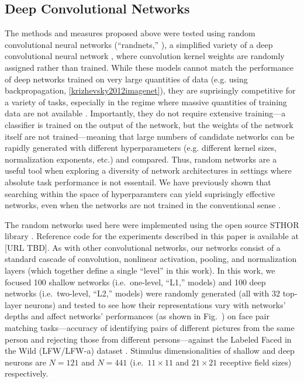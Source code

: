 \subsection{Deep Convolutional Networks}

The methods and measures proposed above were tested using random convolutional neural networks (``randnets,'' \cite{pinto2009high, sthor}), a simplified variety of a deep convolutional neural network \cite{fukushima1980neocognitron, lecun1998gradient, riesenhuber1999hierarchical, krizhevsky2012imagenet}, where convolution kernel weights are randomly assigned rather than trained.  While these models cannot match the performance of deep networks trained on very large quantities of data (e.g. using backpropagation, \ref{krizhevsky2012imagenet}), they are suprisingly competitive for a variety of tasks, especially in the regime where massive quantities of training data are not available \cite{pinto2009high, cox2011beyond, viglarge}.  Importantly, they do not require extensive training---a classifier is trained on the output of the network, but the weights of the network itself are not trained---meaning that large numbers of candidate networks can be rapidly generated with different hyperparameters (e.g. different kernel sizes, normalization exponents, etc.) and compared.  Thus, random networks are a useful tool when exploring a diversity of network architectures in settings where absolute task performance is not essentail.  We have previously shown that searching within the space of hyperparamters can yield suprisingly effective networks, even when the networks are not trained in the conventional sense \cite{james}.

The random networks used here were implemented using the open source STHOR library \cite{sthor}.
Reference code for the experiments described in this paper is available at [URL TBD].  As with other convolutional networks, our networks consist of a standard cascade of convolution, nonlinear activation, pooling, and normalization layers (which together define a single ``level'' in this work).  In this work, we focused 100 shallow networks (i.e.~one-level, ``L1,'' models) and 100 deep networks (i.e.~two-level, ``L2,'' models) were randomly generated (all with 32 top-layer neurons) and tested to see how their representations vary with networks' depths and affect networks' performances (as shown in Fig.~\SFpef{}) on face pair matching tasks---accuracy of identifying pairs of different pictures from the same person and rejecting those from different persons---against the Labeled Faced in the Wild (LFW/LFW-a) dataset \cite{LFWTech, wolf2011effective}. Stimulus dimensionalities of shallow and deep neurons are $N=121$ and $N=441$ (i.e.~$11\times11$ and $21\times21$ receptive field sizes) respectively.


